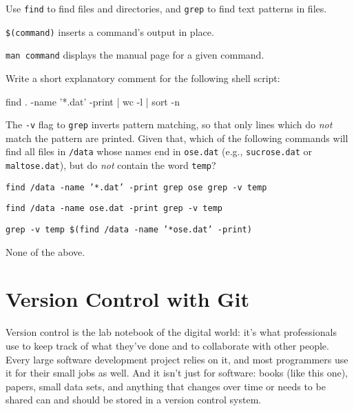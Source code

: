 \documentclass{book}
\begin{document}
\begin{keypoints}
\begin{swcitemize}
\item
  Use \texttt{find} to find files and directories, and \texttt{grep} to
  find text patterns in files.
\item
  \texttt{\$(command)} inserts a command's output in place.
\item
  \texttt{man command} displays the manual page for a given command.
\end{swcitemize}
\end{keypoints}

\begin{challenge}
  Write a short explanatory comment for the following shell script:

\begin{VerbIn}
find . -name '*.dat' -print | wc -l | sort -n
\end{VerbIn}
\end{challenge}

\begin{challenge}
  The \texttt{-v} flag to \texttt{grep} inverts pattern matching, so
  that only lines which do \emph{not} match the pattern are printed.
  Given that, which of the following commands will find all files in
  \texttt{/data} whose names end in \texttt{ose.dat} (e.g.,
  \texttt{sucrose.dat} or \texttt{maltose.dat}), but do \emph{not}
  contain the word \texttt{temp}?

  \begin{swcenumerate}
  \item
    \texttt{find /data -name '*.dat' -print \textbar{} grep ose \textbar{} grep -v temp}
  \item
    \texttt{find /data -name ose.dat -print \textbar{} grep -v temp}
  \item
    \texttt{grep -v temp \$(find /data -name '*ose.dat' -print)}
  \item
    None of the above.
  \end{swcenumerate}
\end{challenge}

\chapter{Version Control with Git}\label{s:git}

Version control is the lab notebook of the digital world: it's what
professionals use to keep track of what they've done and to collaborate
with other people. Every large software development project relies on
it, and most programmers use it for their small jobs as well. And it
isn't just for software: books (like this one), papers, small data sets,
and anything that changes over time or needs to be shared can and should
be stored in a version control system.
\end{document}
